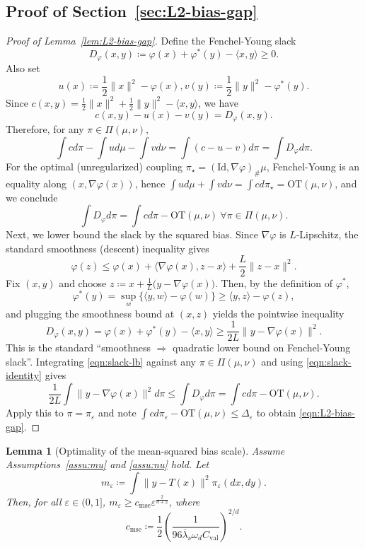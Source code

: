 \documentclass{article}
\theoremstyle{plain}
\newtheorem{lemma}[theorem]{Lemma}
\theoremstyle{definition}
\theoremstyle{remark}
\numberwithin{equation}{section}
\newcommand{\OT}{\mathrm{OT}}
\begin{document}
\subsection{Proof of Section~\ref{sec:L2-bias-gap}}
\begin{proof}[Proof of Lemma~\ref{lem:L2-bias-gap}]
Define the Fenchel-Young slack
$$
D_\varphi(x,y)\coloneqq\varphi(x)+\varphi^*(y)-\langle x,y\rangle\ge0.
$$
Also set
$$
u(x)\coloneqq\frac12\|x\|^2-\varphi(x),v(y)\coloneqq\frac12\|y\|^2-\varphi^*(y).
$$
Since $c(x,y)=\frac12\|x\|^2+\frac12\|y\|^2-\langle x,y\rangle$, we have
$$
c(x,y)-u(x)-v(y)=D_\varphi(x,y).
$$
Therefore, for any $\pi\in\Pi(\mu,\nu)$,
$$
\int cd\pi-\int ud\mu-\int vd\nu=\int (c-u-v)d\pi=\int D_\varphi d\pi.
$$
For the optimal (unregularized) coupling $\pi_\star=(\mathrm{Id},\nabla\varphi)_\#\mu$, Fenchel-Young is an equality along $(x,\nabla\varphi(x))$, hence $\int ud\mu+\int vd\nu=\int cd\pi_\star=\OT(\mu,\nu)$, and we conclude
\begin{equation}\label{eqn:slack-identity}
\int D_\varphi d\pi=\int cd\pi-\OT(\mu,\nu)\ \forall\pi\in\Pi(\mu,\nu).
\end{equation}
Next, we lower bound the slack by the squared bias. 
Since $\nabla\varphi$ is $L$-Lipschitz, the standard smoothness (descent) inequality gives
$$
\varphi(z)\le\varphi(x)+\langle\nabla\varphi(x),z-x\rangle+\frac{L}{2}\|z-x\|^2.
$$
Fix $(x,y)$ and choose $z\coloneqq x+\frac1L\big(y-\nabla\varphi(x)\big)$. 
Then, by the definition of $\varphi^*$,
$$
\varphi^*(y)=\sup_w\{\langle y,w\rangle-\varphi(w)\}\ge\langle y,z\rangle-\varphi(z),
$$
and plugging the smoothness bound at $(x,z)$ yields the pointwise inequality
\begin{equation}\label{eqn:slack-lb}
D_\varphi(x,y)=\varphi(x)+\varphi^*(y)-\langle x,y\rangle\ge\frac{1}{2L}\|y-\nabla\varphi(x)\|^2.
\end{equation}
This is the standard “smoothness $\Rightarrow$ quadratic lower bound on Fenchel-Young slack”.
Integrating \eqref{eqn:slack-lb} against any $\pi\in\Pi(\mu,\nu)$ and using \eqref{eqn:slack-identity} gives
$$
\frac{1}{2L}\int\|y-\nabla\varphi(x)\|^2d\pi\le\int D_\varphi d\pi=\int cd\pi-\OT(\mu,\nu).
$$
Apply this to $\pi=\pi_\varepsilon$ and note $\int cd\pi_\varepsilon-\OT(\mu,\nu)\le\Delta_\varepsilon$ to obtain \eqref{eqn:L2-bias-gap}.
\end{proof}

\begin{lemma}[Optimality of the mean-squared bias scale]\label{lem:mse-lower-bound}
Assume Assumptions~\ref{assu:mu} and \ref{assu:nu} hold.
Let
\[
m_\varepsilon\coloneqq\int\|y-T(x)\|^2\pi_\varepsilon(dx,dy).
\]
Then, for all $\varepsilon\in(0,1]$, $m_\varepsilon\ge c_{\mathrm{mse}}\varepsilon^{\frac{2}{d+2}}$, where
\[
c_{\mathrm{mse}}\coloneqq\frac12\left(\frac{1}{96\overline\lambda_\nu\omega_d C_{\mathrm{val}}}\right)^{2/d}.
\]
\end{lemma}
\end{document}

